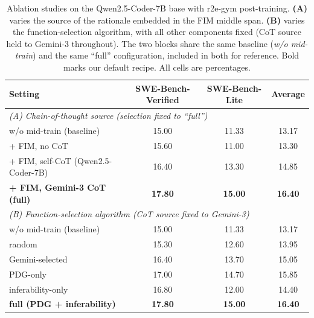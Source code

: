 \begin{table}[t]
\centering
\caption{Ablation studies on the Qwen2.5-Coder-7B base with r2e-gym
post-training. \textbf{(A)} varies the source of the rationale embedded in
the FIM middle span. \textbf{(B)} varies the function-selection algorithm,
with all other components fixed (CoT source held to Gemini-3 throughout).
The two blocks share the same baseline (\emph{w/o mid-train}) and the same
``full'' configuration, included in both for reference. Bold marks our
default recipe. All cells are percentages.}
\label{tab:ablation}
\small
\setlength{\tabcolsep}{8pt}
\begin{tabular}{lccc}
\toprule
Setting & SWE-Bench-Verified & SWE-Bench-Lite & Average \\
\midrule
\multicolumn{4}{l}{\emph{(A) Chain-of-thought source (selection fixed to ``full'')}} \\
\midrule
w/o mid-train (baseline)            & 15.00 & 11.33 & 13.17 \\
+ FIM, no CoT                       & 15.60 & 11.00 & 13.30 \\
+ FIM, self-CoT (Qwen2.5-Coder-7B)  & 16.40 & 13.30 & 14.85 \\
\textbf{+ FIM, Gemini-3 CoT (full)} & \textbf{17.80} & \textbf{15.00} & \textbf{16.40} \\
\midrule
\multicolumn{4}{l}{\emph{(B) Function-selection algorithm (CoT source fixed to Gemini-3)}} \\
\midrule
w/o mid-train (baseline)            & 15.00 & 11.33 & 13.17 \\
random                              & 15.30 & 12.60 & 13.95 \\
Gemini-selected                     & 16.40 & 13.70 & 15.05 \\
PDG-only                            & 17.00 & 14.70 & 15.85 \\
inferability-only                   & 16.80 & 12.00 & 14.40 \\
\textbf{full (PDG + inferability)}  & \textbf{17.80} & \textbf{15.00} & \textbf{16.40} \\
\bottomrule
\end{tabular}
\end{table}

